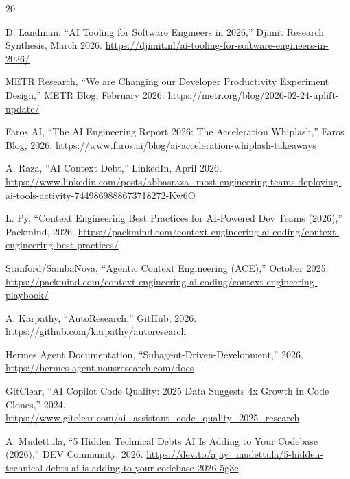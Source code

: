 \documentclass[11pt,a4paper]{article}
\begin{document}
\begin{thebibliography}{20}

D. Landman, ``AI Tooling for Software Engineers in 2026,'' Djimit Research Synthesis, March 2026. \url{https://djimit.nl/ai-tooling-for-software-engineers-in-2026/}

METR Research, ``We are Changing our Developer Productivity Experiment Design,'' METR Blog, February 2026. \url{https://metr.org/blog/2026-02-24-uplift-update/}

Faros AI, ``The AI Engineering Report 2026: The Acceleration Whiplash,'' Faros Blog, 2026. \url{https://www.faros.ai/blog/ai-acceleration-whiplash-takeaways}

A. Raza, ``AI Context Debt,'' LinkedIn, April 2026. \url{https://www.linkedin.com/posts/abbasraza_most-engineering-teams-deploying-ai-tools-activity-7449869888673718272-Kw6O}

L. Py, ``Context Engineering Best Practices for AI-Powered Dev Teams (2026),'' Packmind, 2026. \url{https://packmind.com/context-engineering-ai-coding/context-engineering-best-practices/}

Stanford/SambaNova, ``Agentic Context Engineering (ACE),'' October 2025. \url{https://packmind.com/context-engineering-ai-coding/context-engineering-playbook/}

A. Karpathy, ``AutoResearch,'' GitHub, 2026. \url{https://github.com/karpathy/autoresearch}

Hermes Agent Documentation, ``Subagent-Driven-Development,'' 2026. \url{https://hermes-agent.nousresearch.com/docs}

GitClear, ``AI Copilot Code Quality: 2025 Data Suggests 4x Growth in Code Clones,'' 2024. \url{https://www.gitclear.com/ai_assistant_code_quality_2025_research}

A. Mudettula, ``5 Hidden Technical Debts AI Is Adding to Your Codebase (2026),'' DEV Community, 2026. \url{https://dev.to/ajay_mudettula/5-hidden-technical-debts-ai-is-adding-to-your-codebase-2026-5g3c}

\end{thebibliography}
\end{document}
